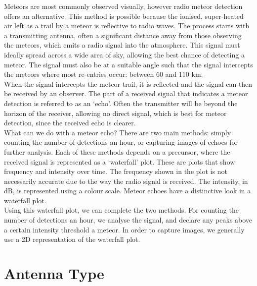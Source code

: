 \documentclass[12pt]{article}
\begin{document}
\large{
Meteors are most commonly observed visually, however radio meteor detection
offers an alternative. This method is possible because the ionised,
super-heated air left as a trail by a meteor is reflective to radio waves. The
process starts with a transmitting antenna, often a significant distance away
from those observing the meteors, which emits a radio signal into the
atmosphere. This signal must ideally spread across a wide area of sky, allowing
the best chance of detecting a meteor. The signal must also be at a suitable
angle such that the signal intercepts the meteors where most re-entries occur:
between 60 and 110 km.\\

When the signal intercepts the meteor trail, it is reflected and the signal can
then be received by an observer. The part of a received signal that indicates a
meteor detection is referred to as an `echo'. Often the transmitter will be
beyond the horizon of the receiver, allowing no direct signal, which is best
for meteor detection, since the received echo is clearer.\\

What can we do with a meteor echo? There are two main methods: simply counting
the number of detections an hour, or capturing images of echoes for further
analysis. Each of these methods depends on a precursor, where the received
signal is represented as a `waterfall' plot. These are plots that show
frequency and intensity over time. The frequency shown in the plot is not
necessarily accurate due to the way the radio signal is received. The
intensity, in dB, is represented using a colour scale. Meteor echoes have a
distinctive look in a waterfall plot. \\

Using this waterfall plot, we can complete the two methods. For counting the
number of detections an hour, we analyse the signal, and declare any peaks
above a certain intensity threshold a meteor. In order to capture images, we
generally use a 2D representation of the waterfall plot. \\
}

\section{Antenna Type}
\end{document}
